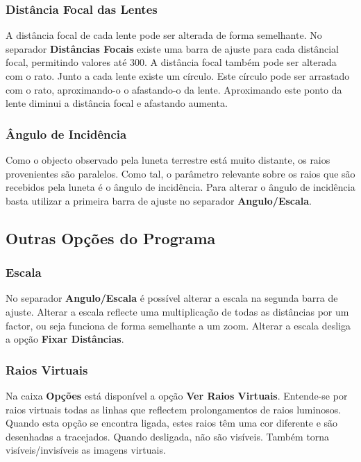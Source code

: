 \documentclass{scrartcl}
\begin{document}
\subsubsection{Distância Focal das Lentes}

A distância focal de cada lente pode ser alterada de forma semelhante. No separador {\bf Distâncias Focais} existe uma barra de ajuste para cada distâncial focal, permitindo valores até 300.
A distância focal também pode ser alterada com o rato. Junto a cada lente existe um círculo. Este círculo pode ser arrastado com o rato, aproximando-o o afastando-o da lente. Aproximando este ponto da lente diminui a distância focal e afastando aumenta.
\par 

\subsubsection{Ângulo de Incidência}

Como o objecto observado pela luneta terrestre está muito distante, os raios provenientes são paralelos. Como tal, o parâmetro relevante sobre os raios que são recebidos pela luneta é o ângulo de incidência. Para alterar o ângulo de incidência basta utilizar a primeira barra de ajuste no separador {\bf Angulo/Escala}.

\subsection{Outras Opções do Programa}

\subsubsection{Escala}

No separador {\bf Angulo/Escala} é possível alterar a escala na segunda barra de ajuste. Alterar a escala reflecte uma multiplicação de todas as distâncias por um factor, ou seja funciona de forma semelhante a um zoom. Alterar a escala desliga a opção {\bf Fixar Distâncias}.
\par

\subsubsection{Raios Virtuais}

Na caixa {\bf Opções} está disponível a opção {\bf Ver Raios Virtuais}. Entende-se por raios virtuais todas as linhas que reflectem prolongamentos de raios luminosos. Quando esta opção se encontra ligada, estes raios têm uma cor diferente e são desenhadas a tracejados. Quando desligada, não são visíveis. Também torna visíveis/invisíveis as imagens virtuais.
\par
\end{document}
